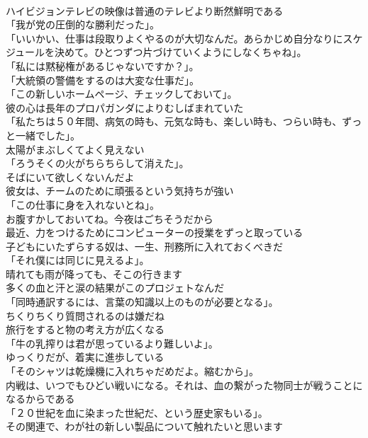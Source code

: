 \documentclass[8pt]{extreport}
\begin{document}
\begin{CJK}{UTF8}{min}
\\	ハイビジョンテレビの映像は普通のテレビより断然鮮明である	
\\	「我が党の圧倒的な勝利だった」。	
\\	「いいかい、仕事は段取りよくやるのが大切なんだ。あらかじめ自分なりにスケジュールを決めて。ひとつずつ片づけていくようにしなくちゃね」。	
\\	「私には黙秘権があるじゃないですか？」。	
\\	「大統領の警備をするのは大変な仕事だ」。	
\\	「この新しいホームページ、チェックしておいて」。	
\\	彼の心は長年のプロパガンダによりむしばまれていた	
\\	「私たちは５０年間、病気の時も、元気な時も、楽しい時も、つらい時も、ずっと一緒でした」。	
\\	太陽がまぶしくてよく見えない	
\\	「ろうそくの火がちらちらして消えた」。	
\\	そばにいて欲しくないんだよ	
\\	彼女は、チームのために頑張るという気持ちが強い	
\\	「この仕事に身を入れないとね」。	
\\	お腹すかしておいてね。今夜はごちそうだから	
\\	最近、力をつけるためにコンピューターの授業をずっと取っている	
\\	子どもにいたずらする奴は、一生、刑務所に入れておくべきだ	
\\	「それ僕には同じに見えるよ」。	
\\	晴れても雨が降っても、そこの行きます	
\\	多くの血と汗と涙の結果がこのプロジェトなんだ	
\\	「同時通訳するには、言葉の知識以上のものが必要となる」。	
\\	ちくりちくり質問されるのは嫌だね	
\\	旅行をすると物の考え方が広くなる	
\\	「牛の乳搾りは君が思っているより難しいよ」。	
\\	ゆっくりだが、着実に進歩している	
\\	「そのシャツは乾燥機に入れちゃだめだよ。縮むから」。	
\\	内戦は、いつでもひどい戦いになる。それは、血の繋がった物同士が戦うことになるからである	
\\	「２０世紀を血に染まった世紀だ、という歴史家もいる」。	
\\	その関連で、わが社の新しい製品について触れたいと思います	

\end{CJK}
\end{document}
